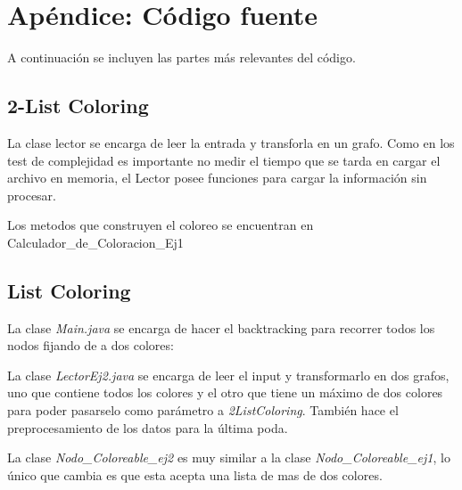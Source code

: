 \newpage
\section{Apéndice: Código fuente}

A continuación se incluyen las partes más relevantes del código.\\

\subsection{2-List Coloring}

La clase lector se encarga de leer la entrada y transforla en un grafo. Como en los test de complejidad es importante no medir el tiempo que se tarda en cargar el archivo en memoria, el Lector posee funciones para cargar la información sin procesar.

Los metodos que construyen el coloreo se encuentran en Calculador_de_Coloracion_Ej1 \\



\newpage

\subsection{List Coloring}

La clase \emph{Main.java} se encarga de hacer el backtracking para recorrer todos los nodos fijando de a dos colores:


La clase \emph{LectorEj2.java} se encarga de leer el input y transformarlo en dos grafos, uno que contiene todos los colores y el otro que tiene un máximo de dos colores para poder pasarselo como parámetro a \emph{2ListColoring}. También hace el preprocesamiento de los datos para la última poda.


La clase \emph{Nodo_Coloreable_ej2} es muy similar a la clase \emph{Nodo_Coloreable_ej1}, lo único que cambia es que esta acepta una lista de mas de dos colores.



